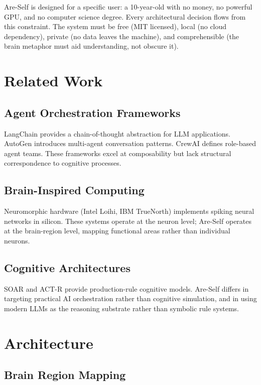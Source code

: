 \documentclass[man,12pt,floatsintext]{apa7}
\begin{document}
Are-Self is designed for a specific user: a 10-year-old with no money, no powerful GPU,
and no computer science degree. Every architectural decision flows from this constraint.
The system must be free (MIT licensed), local (no cloud dependency), private (no data
leaves the machine), and comprehensible (the brain metaphor must aid understanding, not
obscure it).

\section{Related Work}

\subsection{Agent Orchestration Frameworks}

LangChain \parencite{} provides a chain-of-thought abstraction for LLM applications.
AutoGen \parencite{} introduces multi-agent conversation patterns. CrewAI defines
role-based agent teams. These frameworks excel at composability but lack structural
correspondence to cognitive processes.

\subsection{Brain-Inspired Computing}

Neuromorphic hardware (Intel Loihi, IBM TrueNorth) implements spiking neural networks
in silicon. These systems operate at the neuron level; Are-Self operates at the
brain-region level, mapping functional areas rather than individual neurons.

\subsection{Cognitive Architectures}

SOAR and ACT-R provide production-rule cognitive models. Are-Self differs in targeting
practical AI orchestration rather than cognitive simulation, and in using modern LLMs
as the reasoning substrate rather than symbolic rule systems.

\section{Architecture}
\label{sec:architecture}

\subsection{Brain Region Mapping}
\end{document}
